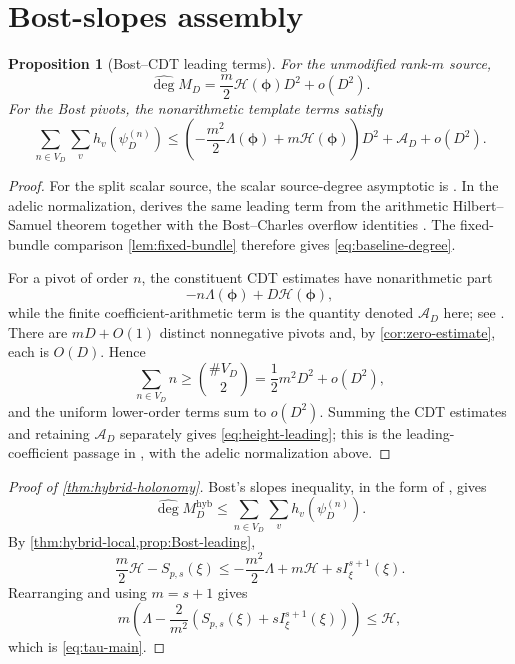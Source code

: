 \documentclass[11pt]{article}
\newtheorem{proposition}[proposition]{Proposition}
\theoremstyle{definition}
\theoremstyle{remark}
\newcommand{\widehatdeg}{\widehat{\deg}}
\newcommand{\Energy}{\mathscr H}
\newcommand{\LambdaAH}{\Lambda}
\begin{document}
\section{Bost-slopes assembly}\label{sec:bost}

\begin{proposition}[Bost--CDT leading terms]\label{prop:Bost-leading}
For the unmodified rank-$m$ source,
\begin{equation}\label{eq:baseline-degree}
 \widehatdeg M_D=\frac m2\Energy(\boldsymbol\phi)D^2+o(D^2).
\end{equation}
For the Bost pivots, the nonarithmetic template terms satisfy
\begin{equation}\label{eq:height-leading}
 \sum_{n\in V_D}\sum_vh_v(\psi_D^{(n)})
 \le\left(-\frac{m^2}{2}\LambdaAH(\boldsymbol\phi)
 +m\Energy(\boldsymbol\phi)\right)D^2
 +\mathscr A_D+o(D^2).
\end{equation}
\end{proposition}

\begin{proof}
For the split scalar source, the scalar source-degree asymptotic is
\cite[(7.3.7)]{CDT2024}.  In the adelic normalization,
\cite[Section~2.3 and the proof of Theorem~2.6]{CDT2025} derives the same
leading term from the arithmetic Hilbert--Samuel theorem together with the
Bost--Charles overflow identities
\cite[Theorem~5.4.1 and Proposition~5.4.2]{BostCharles2022}.
The fixed-bundle comparison \cref{lem:fixed-bundle} therefore gives
\eqref{eq:baseline-degree}.

For a pivot of order $n$, the constituent CDT estimates have nonarithmetic
part
\[
 -n\LambdaAH(\boldsymbol\phi)+D\Energy(\boldsymbol\phi),
\]
while the finite coefficient-arithmetic term is the quantity denoted
$\mathscr A_D$ here; see \cite[(7.3.14)--(7.3.15)]{CDT2024}.  There are
$mD+O(1)$ distinct nonnegative pivots and, by
\cref{cor:zero-estimate}, each is $O(D)$.  Hence
\[
 \sum_{n\in V_D}n\ge\binom{\#V_D}{2}
 =\frac12m^2D^2+o(D^2),
\]
and the uniform lower-order terms sum to $o(D^2)$.  Summing the CDT estimates
and retaining $\mathscr A_D$ separately gives \eqref{eq:height-leading}; this
is the leading-coefficient passage in
\cite[(7.3.14)--(7.3.16)]{CDT2024}, with the adelic normalization above.
\end{proof}

\begin{proof}[Proof of \cref{thm:hybrid-holonomy}]
Bost's slopes inequality, in the form of
\cite[(7.3.16)]{CDT2024}, gives
\[
 \widehatdeg M_D^{\mathrm{hyb}}
 \le\sum_{n\in V_D}\sum_vh_v(\psi_D^{(n)}).
\]
By \cref{thm:hybrid-local,prop:Bost-leading},
\[
 \frac m2\Energy-S_{p,s}(\xi)
 \le-\frac{m^2}{2}\LambdaAH+m\Energy
 +sI^{s+1}_\xi(\xi).
\]
Rearranging and using $m=s+1$ gives
\[
 m\left(\LambdaAH-
 \frac{2}{m^2}(S_{p,s}(\xi)+sI^{s+1}_\xi(\xi))\right)
 \le\Energy,
\]
which is \eqref{eq:tau-main}.
\end{proof}
\end{document}
